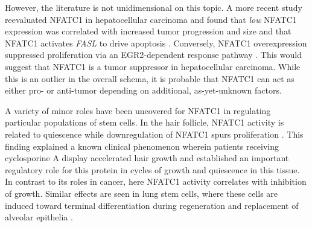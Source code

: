 However, the literature is not unidimensional on this topic. A more recent study reevaluated NFATC1 in hepatocellular carcinoma and found that \textit{low} NFATC1 expression was correlated with increased tumor progression and size and that NFATC1 activates \textit{FASL} to drive apoptosis \citep{Xu2018}. Conversely, NFATC1 overexpression suppressed proliferation via an EGR2\hyp{}dependent response pathway \citep{Wang2020a}. This would suggest that NFATC1 is a tumor suppressor in hepatocellular carcinoma. While this is an outlier in the overall schema, it is probable that NFATC1 can act as either pro\hyp{} or anti\hyp{}tumor depending on additional, as\hyp{}yet\hyp{}unknown factors. 

A variety of minor roles have been uncovered for NFATC1 in regulating particular populations of stem cells. In the hair follicle, NFATC1 activity is related to quiescence while downregulation of NFATC1 spurs proliferation \citep{Horsley2008, Keyes2013}. This finding explained a known clinical phenomenon wherein patients receiving cyclosporine A display accelerated hair growth and established an important regulatory role for this protein in cycles of growth and quiescence in this tissue. In contrast to its roles in cancer, here NFATC1 activity correlates with inhibition of growth. Similar effects are seen in lung stem cells, where these cells are induced toward terminal differentiation during regeneration and replacement of alveolar epithelia \citep{Lee2014}.

